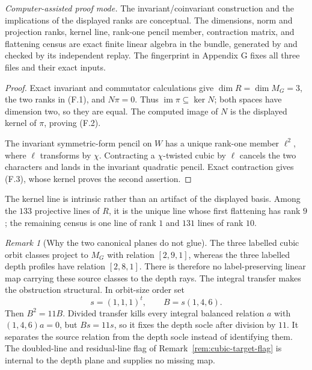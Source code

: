 \documentclass[11pt]{article}
\theoremstyle{definition}
\theoremstyle{remark}
\newtheorem{remark}[theorem]{Remark}
\begin{document}
\noindent\emph{Computer-assisted proof mode.}
The invariant/coinvariant construction and the implications of the
displayed ranks are conceptual.  The dimensions, norm and projection
ranks, kernel line, rank-one pencil member, contraction matrix, and
flattening census are exact finite linear algebra in the
 bundle, generated
by  and checked by its independent replay.
The fingerprint in Appendix G fixes all three files and their exact inputs.

\begin{proof}
Exact invariant and commutator calculations give
$\dim R=\dim M_G=3$, the two ranks in (F.1), and $N\pi=0$.
Thus $\operatorname{im}\pi\subseteq\ker N$; both spaces have dimension
two, so they are equal.  The computed image of $N$ is the displayed
kernel of $\pi$, proving (F.2).

The invariant symmetric-form pencil on $W$ has a unique rank-one member
$\ell^2$, where $\ell$ transforms by $\chi$.  Contracting a
$\chi$-twisted cubic by $\ell$ cancels the two characters and lands in
the invariant quadratic pencil.  Exact contraction gives (F.3), whose
kernel proves the second assertion.
\end{proof}

The kernel line is intrinsic rather than an artifact of the displayed
basis.  Among the $133$ projective lines of $R$, it is the unique line
whose first flattening has rank $9$; the remaining census is one line
of rank $1$ and $131$ lines of rank $10$.

\begin{remark}[Why the two canonical planes do not glue]
\label{rem:tate-depth-boundary}
The three labelled cubic orbit classes project to $M_G$ with relation
$[2,9,1]$, whereas the three labelled depth profiles have relation
$[2,8,1]$.  There is therefore no label-preserving linear map carrying
these source classes to the depth rays.  The integral transfer makes
the obstruction structural.  In orbit-size order set
\[
 s=(1,1,1)^t,\qquad B=s(1,4,6).
\]
Then $B^2=11B$.  Divided transfer kills every integral balanced
relation $a$ with $(1,4,6)a=0$, but $Bs=11s$, so it fixes the depth
socle after division by $11$.  It separates the source relation from
the depth socle instead of identifying them.  The doubled-line and
residual-line flag of Remark~\ref{rem:cubic-target-flag} is internal to
the depth plane and supplies no missing map.
\end{remark}
\end{document}
